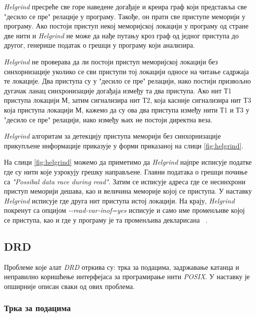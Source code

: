 \documentclass[12pt,oneside]{memoir}
\begin{document}
\indent \textit{Helgrind} пресреће све горе наведене догађаје и креира граф који представља све "десило се пре" релације у програму. Такође, он прати све приступе меморији у програму. Ако постоји приступ некој меморијској локацији у програму од стране две нити и \textit{Helgrind} не може да нађе путању кроз граф од једног приступа до другог, генерише податак о грешци у програму који анализира.

\indent \textit{Helgrind} не проверава да ли постоји приступ меморијској локацији без синхорнизације уколико се сви приступи тој локацији односе на читање садржаја те локације. Два приступа су у "десило се пре" релацији, иако постији призвољно дугачак ланац синхронизације догађаја између та два приступа. Ако нит Т1 приступа локацији М, затим сигнализира нит Т2, која касније сигнализира нит Т3 која приступа локацији М, кажемо да су ова два приступа између нити Т1 и Т3 у "десило се пре" релацији, иако између њих не постоји директна веза.

\indent \textit{Helgrind} алгоритам за детекцију приступа меморији без синхорнизације прикупљене информације приказује у форми приказаној на слици \ref{fig:helgrind}. 

\indent На слици \ref{fig:helgrind} можемо да приметимо да \textit{Helgrind} најпре исписује податке где су нити које узрокују грешку направљене. Главни података о грешци почиње са \textit{"Possibal data race during read"}. Затим се исписује адреса где се несинхрони приступ меморији дешава, као и величина меморије којој се приступа. У наставку \textit{Helgrind} исписује где друга нит приступа истој локацији. На крају, \textit{Helgrind} покренут са опцијом \textit{-\--read-var-inof=yes} исписује и само име променљиве којој се приступа, као и где у програму је та променљива декларисана ~\cite{helgrindRef}.

\subsection{DRD}

\indent Проблеме које алат \textit{DRD} отркива су: трка за подацима, задржавање катанца и неправилно коришћење интерфејаса за програмирање нити \textit{POSIX}. У наставку је опширније описан сваки од ових проблема.


\subsubsection{Трка за подацима}
\end{document}
